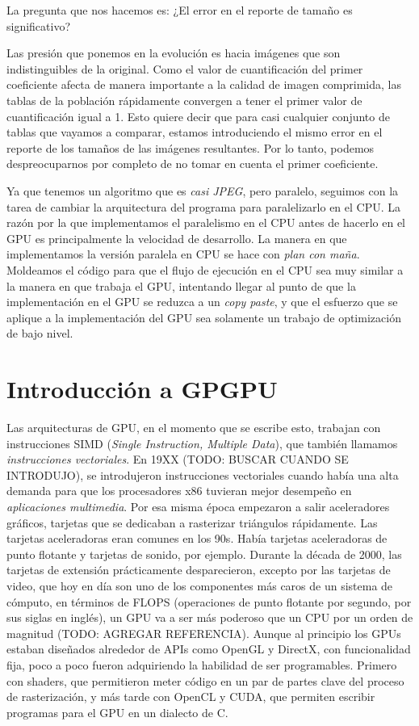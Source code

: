 La pregunta que nos hacemos es: ¿El error en el reporte de tamaño es
significativo?

Las presión que ponemos en la evolución es hacia imágenes que son
indistinguibles de la original. Como el valor de cuantificación del primer
coeficiente afecta de manera importante a la calidad de imagen comprimida, las
tablas de la población rápidamente convergen a tener el primer valor de
cuantificación igual a 1. Esto quiere decir que para casi cualquier conjunto de
tablas que vayamos a comparar, estamos introduciendo el mismo error en el
reporte de los tamaños de las imágenes resultantes. Por lo tanto, podemos
despreocuparnos por completo de no tomar en cuenta el primer coeficiente.

Ya que tenemos un algoritmo que es \emph{casi JPEG}, pero paralelo, seguimos
con la tarea de cambiar la arquitectura del programa para paralelizarlo en el
CPU. La razón por la que implementamos el paralelismo en el CPU antes de
hacerlo en el GPU es principalmente la velocidad de desarrollo. La manera en
que implementamos la versión paralela en CPU se hace con \emph{plan con maña}.
Moldeamos el código para que el flujo de ejecución en el CPU sea muy
similar a la manera en que trabaja el GPU, intentando llegar al punto de que la
implementación en el GPU se reduzca a un \emph{copy paste}, y que el esfuerzo
que se aplique a la implementación del GPU sea solamente un trabajo de
optimización de bajo nivel.

\section{Introducción a GPGPU}

Las arquitecturas de GPU, en el momento que se escribe esto, trabajan con
instrucciones SIMD (\emph{Single Instruction, Multiple Data}), que también
llamamos \emph{instrucciones vectoriales}. En 19XX (TODO: BUSCAR CUANDO SE
INTRODUJO), se introdujeron instrucciones vectoriales cuando había una alta
demanda para que los procesadores x86 tuvieran mejor desempeño en
\emph{aplicaciones multimedia}. Por esa misma época empezaron a salir
aceleradores gráficos, tarjetas que se dedicaban a rasterizar triángulos
rápidamente. Las tarjetas aceleradoras eran comunes en los 90s. Había tarjetas
aceleradoras de punto flotante y tarjetas de sonido, por ejemplo. Durante la
década de 2000, las tarjetas de extensión prácticamente desparecieron,
excepto por las tarjetas de video, que hoy en día son uno de los componentes
más caros de un sistema de cómputo, en términos de FLOPS (operaciones de punto
flotante por segundo, por sus siglas en inglés), un GPU va a ser más poderoso
que un CPU por un orden de magnitud (TODO: AGREGAR REFERENCIA). Aunque al
principio los GPUs estaban diseñados alrededor de APIs como OpenGL y DirectX,
con funcionalidad fija, poco a poco fueron adquiriendo la habilidad de ser
programables. Primero con shaders, que permitieron meter código en un par de
partes clave del proceso de rasterización, y más tarde con OpenCL y CUDA, que
permiten escribir programas para el GPU en un dialecto de C.

